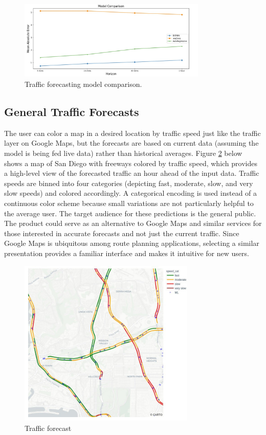 \documentclass{article}
\begin{document}
\begin{figure}[hbt!]
	\centering
	\includegraphics[width=0.8\textwidth]{images/model_comparison.jpeg}
	\caption{Traffic forecasting model comparison.}
	\label{fig:model-comparison}
\end{figure}

\subsection{General Traffic Forecasts}

The user can color a map in a desired location by traffic speed just like the traffic layer on Google Maps, but the forecasts are based on current data (assuming the model is being fed live data) rather than historical averages. Figure \ref{fig:traffic-forecast-map} below shows a map of San Diego with freeways colored by traffic speed, which provides a high-level view of the forecasted traffic an hour ahead of the input data. Traffic speeds are binned into four categories (depicting fast, moderate, slow, and very slow speeds) and colored accordingly. A categorical encoding is used instead of a continuous color scheme because small variations are not particularly helpful to the average user. The target audience for these predictions is the general public. The product could serve as an alternative to Google Maps and similar services for those interested in accurate forecasts and not just the current traffic. Since Google Maps is ubiquitous among route planning applications, selecting a similar presentation provides a familiar interface and makes it intuitive for new users. 

\begin{figure}[hbt!]
	\centering
	\includegraphics[width=0.75\textwidth]{images/traffic_map.jpeg}
	\caption{Traffic forecast}
	\label{fig:traffic-forecast-map}
\end{figure}
\end{document}
